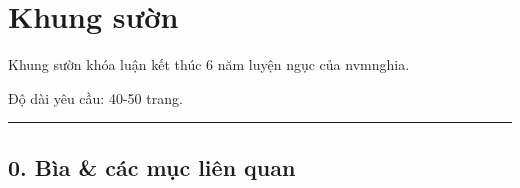 \hypertarget{khung-sux1b0ux1eddn}{%
  \section{Khung sườn}\label{khung-sux1b0ux1eddn}}

Khung sườn khóa luận kết thúc 6 năm luyện ngục của nvmnghia.

Độ dài yêu cầu: 40-50 trang.

\begin{center}\rule{0.5\linewidth}{0.5pt}\end{center}

\hypertarget{buxeca-cuxe1c-mux1ee5c-liuxean-quan}{%
  \subsection{0. Bìa \& các mục liên
    quan}\label{buxeca-cuxe1c-mux1ee5c-liuxean-quan}}


